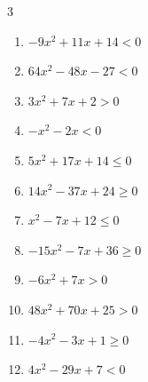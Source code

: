 \begin{multicols}{3}
\begin{enumerate}

  \item $-9x^{2}+11x+14<0$


  \item $64x^{2}-48x-27<0$


  \item $3x^{2}+7x+2>0$


  \item $-x^{2}-2x<0$

        \phantom{$\displaystyle x < -2 , \; 0 < x$}

  \item $5x^{2}+17x+14\leq 0$


  \item $14x^{2}-37x+24\geq 0$


  \item $x^{2}-7x+12\leq 0$

        \phantom{$\displaystyle 3 \leqq x \leqq 4$}

\columnbreak %

\resetques

  \item $-15x^{2}-7x+36\geq 0$


  \item $-6x^{2}+7x>0$


  \item $48x^{2}+70x+25>0$


  \item $-4x^{2}-3x+1\geq 0$


  \item $4x^{2}-29x+7<0$


\end{enumerate}
\end{multicols}
